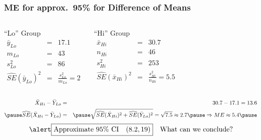\documentclass[handout]{beamer}
\begin{document}
\begin{frame}
\frametitle{ME for approx.\ 95\% for Difference of Means}

\small
\singlespacing
\begin{columns} 
	\begin{block}{``Lo'' Group}
		\begin{eqnarray*}
			\bar{y}_{Lo} &=&17.1 \\
			m_{Lo} &=& 43\\  
			s^2_{Lo} &=& 86\\ 
			\widehat{SE}(\bar{y}_{Lo})^2 &=& \frac{s^2_{Lo}}{m_{Lo}} = 2
		\end{eqnarray*}
	\end{block}
	
		\begin{block}{``Hi'' Group}
		\begin{eqnarray*}
			\bar{x}_{Hi} &=& 30.7\\
			n_{Hi} &=& 46\\  
			s^2_{Hi} &=& 253\\
			\widehat{SE}(\bar{x}_{Hi})^2 &=& \frac{s^2_{Hi}}{n_{Hi}} = 5.5
		\end{eqnarray*}
	\end{block}
\end{columns}

\pause
	\begin{eqnarray*}
		\bar{X}_{Hi} - \bar{Y}_{Lo} &=& 30.7 - 17.1 =  13.6\\ \pause
		\widehat{SE}(\bar{X}_{Hi} - \bar{Y}_{Lo}) &=& \pause \sqrt{\widehat{SE}(\bar{X}_{Hi})^2 + \widehat{SE}(\bar{Y}_{Lo})^2} = \sqrt{7.5}  \approx 2.7 \pause \Rightarrow ME \approx 5.4 \pause 
	\end{eqnarray*}
	$$\alert{\boxed{\mbox{Approximate 95\% CI} \quad (8.2, 19)}} \quad \mbox{What can we conclude?}$$


\end{frame}
\end{document}
